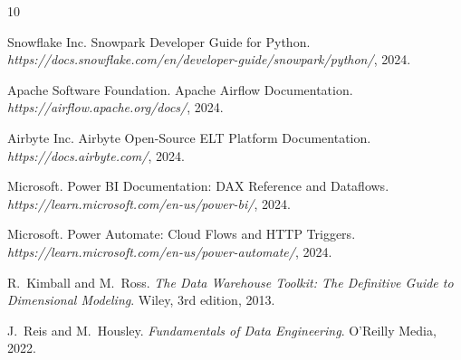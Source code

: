 \documentclass[11pt,a4paper]{article}
\begin{document}

\begin{thebibliography}{10}

Snowflake Inc.
\newblock Snowpark Developer Guide for Python.
\newblock \emph{https://docs.snowflake.com/en/developer-guide/snowpark/python/}, 2024.

Apache Software Foundation.
\newblock Apache Airflow Documentation.
\newblock \emph{https://airflow.apache.org/docs/}, 2024.

Airbyte Inc.
\newblock Airbyte Open-Source ELT Platform Documentation.
\newblock \emph{https://docs.airbyte.com/}, 2024.

Microsoft.
\newblock Power BI Documentation: DAX Reference and Dataflows.
\newblock \emph{https://learn.microsoft.com/en-us/power-bi/}, 2024.

Microsoft.
\newblock Power Automate: Cloud Flows and HTTP Triggers.
\newblock \emph{https://learn.microsoft.com/en-us/power-automate/}, 2024.

R.~Kimball and M.~Ross.
\newblock \emph{The Data Warehouse Toolkit: The Definitive Guide to Dimensional Modeling}.
\newblock Wiley, 3rd edition, 2013.

J.~Reis and M.~Housley.
\newblock \emph{Fundamentals of Data Engineering}.
\newblock O'Reilly Media, 2022.

\end{thebibliography}
\end{document}
